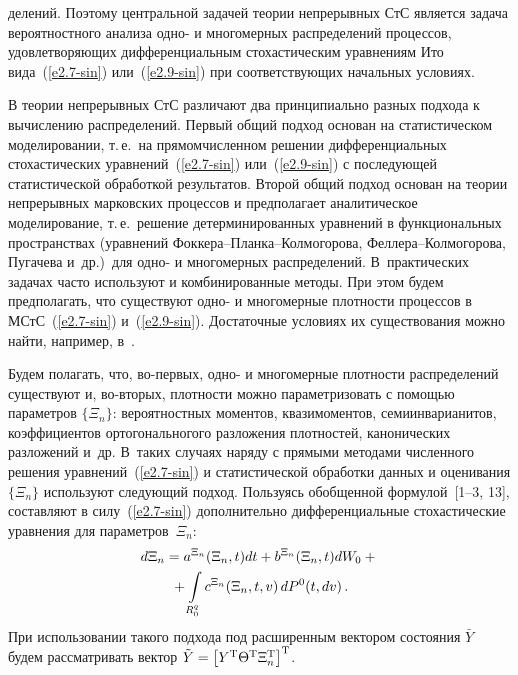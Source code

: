 \begin{multicols}{2}
\columnbreak

\noindent
делений. Поэтому центральной
задачей теории непрерывных СтС является задача вероятностного анализа одно- и многомерных
распределений процессов, удовлетворяющих дифференциальным стохастическим
уравнениям Ито вида~(\ref{e2.7-sin}) или~(\ref{e2.9-sin}) при
соответствующих начальных условиях.

В теории непрерывных СтС различают два принципиально разных подхода
к вычислению распределений. Первый общий подход основан на
статистическом моделировании, т.\,е.\ на прямом\linebreak чис\-лен\-ном решении
дифференциальных  стохастических уравнений~(\ref{e2.7-sin}) или~(\ref{e2.9-sin}) с
последующей статис\-тической обработкой результатов. Второй \mbox{общий}
подход основан на теории непрерывных марковских процессов и
предполагает аналитическое моделирование, т.\,е.\ решение
детерминированных уравнений в функциональных пространствах
(уравнений Фок\-ке\-ра--План\-ка--Кол\-мо\-го\-ро\-ва, Фел\-ле\-ра--Кол\-мо\-го\-ро\-ва,
Пугачева и~др.)\ для одно- и многомерных распределений. В~практических задачах часто используют и комбинированные методы. При
этом будем предполагать, что существуют  одно- и многомерные
плотности процессов в МСтС~(\ref{e2.7-sin}) и~(\ref{e2.9-sin}). Достаточные условиях их
существования можно найти, например, в~\cite{13-sin}.

Будем полагать, что, во-пер\-вых, одно- и многомерные плотности распределений существуют и, 
во-вто\-рых, плотности можно параметризовать с помощью параметров $\{\Xi_n\}$: вероятностных моментов, 
квазимоментов, семиинварианитов, коэффициентов ортогональногого разложения плотностей, канонических разложений 
и~др. В~таких случаях наряду с прямыми методами численного решения уравнений~(\ref{e2.7-sin}) 
и статистической обработки данных и оценивания $\{\Xi_n\}$  используют следующий подход. Пользуясь обобщенной 
формулой~[1--3, 13], со\-став\-ля\-ют  в силу~(\ref{e2.7-sin}) 
дополнительно дифференциальные стохастические уравнения для параметров~$\Xi_n$:
\begin{multline*}
d\Xi_n = a^{\Xi_n} (\Xi_n,t) dt + b^{\Xi_n} (\Xi_n,t) dW_0+{}\\
{}+ \iii_{R_0^q} c^{\Xi_n} (\Xi_n,t,v)\, dP^0 (t,dv)\,. %
\end{multline*}
При использовании такого подхода под расширенным вектором состояния $\bar Y$ будем рассматривать вектор 
$\tilde Y \hm= \lk Y^{\mathrm{T}} \Theta^{\mathrm{T}} \Xi_n^{\mathrm{T}}\rk^{\mathrm{T}}$.


\end{multicols}
